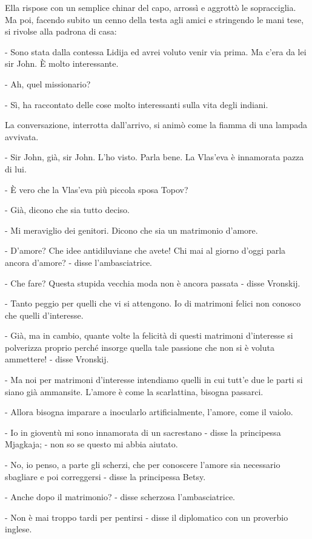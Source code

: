 Ella rispose con un semplice chinar del capo, arrossì e aggrottò le sopracciglia. Ma poi, facendo subito un cenno della testa agli amici e stringendo le mani tese, si rivolse alla padrona di casa: 

- Sono stata dalla contessa Lidija ed avrei voluto venir via prima. Ma c'era da lei sir John. È molto interessante. 

- Ah, quel missionario? 

- Sì, ha raccontato delle cose molto interessanti sulla vita degli indiani. 

La conversazione, interrotta dall'arrivo, si animò come la fiamma di una lampada avvivata. 

- Sir John, già, sir John. L'ho visto. Parla bene. La Vlas'eva è innamorata pazza di lui. 

- È vero che la Vlas'eva più piccola sposa Topov? 

- Già, dicono che sia tutto deciso. 

- Mi meraviglio dei genitori. Dicono che sia un matrimonio d'amore. 

- D'amore? Che idee antidiluviane che avete! Chi mai al giorno d'oggi parla ancora d'amore? - disse l'ambasciatrice. 

- Che fare? Questa stupida vecchia moda non è ancora passata - disse Vronskij. 

- Tanto peggio per quelli che vi si attengono. Io di matrimoni felici non conosco che quelli d'interesse. 

- Già, ma in cambio, quante volte la felicità di questi matrimoni d'interesse si polverizza proprio perché insorge quella tale passione che non si è voluta ammettere! - disse Vronskij. 

- Ma noi per matrimoni d'interesse intendiamo quelli in cui tutt'e due le parti si siano già ammansite. L'amore è come la scarlattina, bisogna passarci. 

- Allora bisogna imparare a inocularlo artificialmente, l'amore, come il vaiolo. 

- Io in gioventù mi sono innamorata di un sacrestano - disse la principessa Mjagkaja; - non so se questo mi abbia aiutato. 

- No, io penso, a parte gli scherzi, che per conoscere l'amore sia necessario sbagliare e poi correggersi - disse la principessa Betsy. 

- Anche dopo il matrimonio? - disse scherzosa l'ambasciatrice. 

- Non è mai troppo tardi per pentirsi - disse il diplomatico con un proverbio inglese. 

